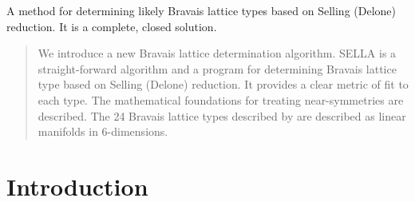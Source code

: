 \documentclass[preprint]{iucr}              %
\begin{document}
	
	
	\maketitle                        %
	
	\begin{synopsis}
		A method for determining likely Bravais lattice types based on Selling (Delone) 
		reduction. It is a complete, closed solution.
	\end{synopsis}
	
	\begin{abstract}
		We introduce a new Bravais lattice determination algorithm. SELLA is a 
		straight-forward algorithm and a program for determining Bravais lattice type 
		based on Selling (Delone) reduction. It provides a clear metric of fit to each type. The mathematical foundations for treating near-symmetries are
		described. The 24 Bravais lattice types described by  
		are described as linear manifolds in 6-dimensions.
	\end{abstract}
	
	
	
	\section{Introduction}
	
\end{document}
